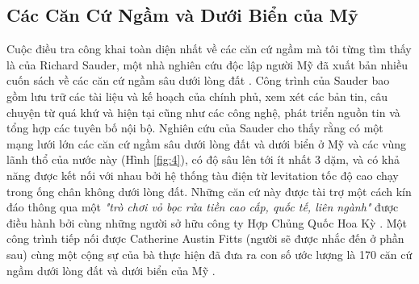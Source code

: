 \documentclass[10pt,twocolumn,letterpaper]{article}
\begin{document}
\subsection{Các Căn Cứ Ngầm và Dưới Biển của Mỹ}

Cuộc điều tra công khai toàn diện nhất về các căn cứ ngầm mà tôi từng tìm thấy là của Richard Sauder, một nhà nghiên cứu độc lập người Mỹ đã xuất bản nhiều cuốn sách về các căn cứ ngầm sâu dưới lòng đất \cite{22}. Công trình của Sauder bao gồm lưu trữ các tài liệu và kế hoạch của chính phủ, xem xét các bản tin, câu chuyện từ quá khứ và hiện tại cũng như các công nghệ, phát triển nguồn tin và tổng hợp các tuyên bố nội bộ. Nghiên cứu của Sauder cho thấy rằng có một mạng lưới lớn các căn cứ ngầm sâu dưới lòng đất và dưới biển ở Mỹ và các vùng lãnh thổ của nước này (Hình \ref{fig:4}), có độ sâu lên tới ít nhất 3 dặm, và có khả năng được kết nối với nhau bởi hệ thống tàu điện từ levitation tốc độ cao chạy trong ống chân không dưới lòng đất. Những căn cứ này được tài trợ một cách kín đáo thông qua một \textit{"trò chơi vỏ bọc rửa tiền cao cấp, quốc tế, liên ngành"} được điều hành bởi cùng những người sở hữu công ty Hợp Chủng Quốc Hoa Kỳ \cite{22}. Một công trình tiếp nối được Catherine Austin Fitts (người sẽ được nhắc đến ở phần sau) cùng một cộng sự của bà thực hiện đã đưa ra con số ước lượng là 170 căn cứ ngầm dưới lòng đất và dưới biển của Mỹ \cite{16,20}.
\end{document}
